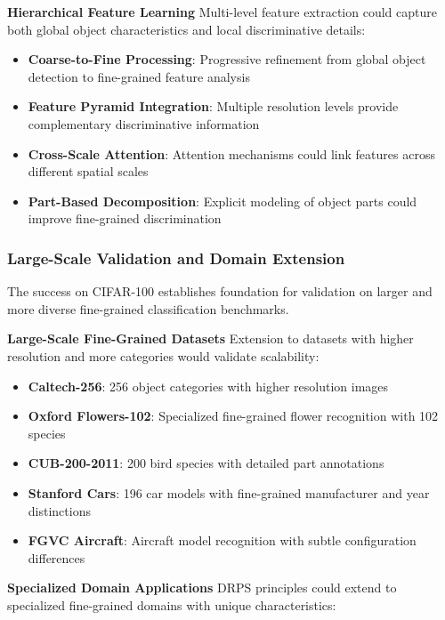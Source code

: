 \documentclass[12pt]{article}
\begin{document}
\textbf{Hierarchical Feature Learning}
Multi-level feature extraction could capture both global object characteristics and local discriminative details:

\begin{itemize}
\item \textbf{Coarse-to-Fine Processing}: Progressive refinement from global object detection to fine-grained feature analysis
\item \textbf{Feature Pyramid Integration}: Multiple resolution levels provide complementary discriminative information
\item \textbf{Cross-Scale Attention}: Attention mechanisms could link features across different spatial scales
\item \textbf{Part-Based Decomposition}: Explicit modeling of object parts could improve fine-grained discrimination
\end{itemize}

\subsubsection{Large-Scale Validation and Domain Extension}\label{large-scale-future}

The success on CIFAR-100 establishes foundation for validation on larger and more diverse fine-grained classification benchmarks.

\textbf{Large-Scale Fine-Grained Datasets}
Extension to datasets with higher resolution and more categories would validate scalability:

\begin{itemize}
\item \textbf{Caltech-256}: 256 object categories with higher resolution images
\item \textbf{Oxford Flowers-102}: Specialized fine-grained flower recognition with 102 species
\item \textbf{CUB-200-2011}: 200 bird species with detailed part annotations
\item \textbf{Stanford Cars}: 196 car models with fine-grained manufacturer and year distinctions
\item \textbf{FGVC Aircraft}: Aircraft model recognition with subtle configuration differences
\end{itemize}

\textbf{Specialized Domain Applications}
DRPS principles could extend to specialized fine-grained domains with unique characteristics:
\end{document}
